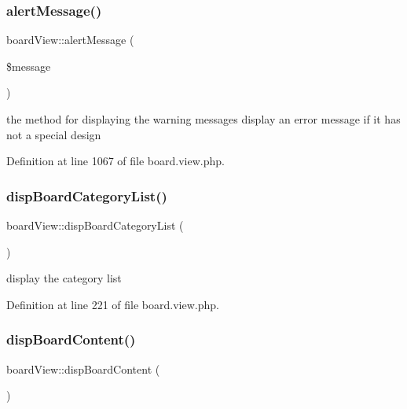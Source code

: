 \subsubsection{\texorpdfstring{alert\+Message()}{alertMessage()}}
{\footnotesize\ttfamily board\+View\+::alert\+Message (\begin{DoxyParamCaption}\item[{}]{\$message }\end{DoxyParamCaption})}



the method for displaying the warning messages display an error message if it has not a special design 



Definition at line 1067 of file board.\+view.\+php.

\mbox{\label{classboardView_a94785091050c4d88f6fa03c94c6a59e0}} 
\subsubsection{\texorpdfstring{disp\+Board\+Category\+List()}{dispBoardCategoryList()}}
{\footnotesize\ttfamily board\+View\+::disp\+Board\+Category\+List (\begin{DoxyParamCaption}{ }\end{DoxyParamCaption})}



display the category list 



Definition at line 221 of file board.\+view.\+php.

\mbox{\label{classboardView_a713010ff8458ff4e7970878eeda17e20}} 
\subsubsection{\texorpdfstring{disp\+Board\+Content()}{dispBoardContent()}}
{\footnotesize\ttfamily board\+View\+::disp\+Board\+Content (\begin{DoxyParamCaption}{ }\end{DoxyParamCaption})}



